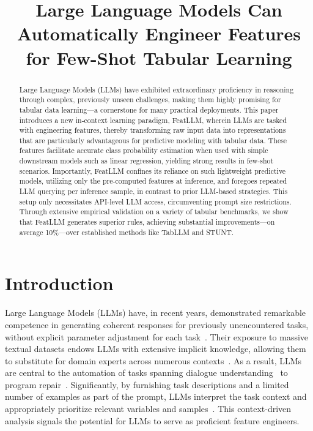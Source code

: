 \title{Large Language Models Can Automatically Engineer Features for Few-Shot Tabular Learning}

\begin{abstract}
Large Language Models (LLMs) have exhibited extraordinary proficiency in reasoning through complex, previously unseen challenges, making them highly promising for tabular data learning—a cornerstone for many practical deployments. This paper introduces a new in-context learning paradigm, \textsf{FeatLLM}, wherein LLMs are tasked with engineering features, thereby transforming raw input data into representations that are particularly advantageous for predictive modeling with tabular data. These features facilitate accurate class probability estimation when used with simple downstream models such as linear regression, yielding strong results in few-shot scenarios. Importantly, \textsf{FeatLLM} confines its reliance on such lightweight predictive models, utilizing only the pre-computed features at inference, and foregoes repeated LLM querying per inference sample, in contrast to prior LLM-based strategies. This setup only necessitates API-level LLM access, circumventing prompt size restrictions. Through extensive empirical validation on a variety of tabular benchmarks, we show that \textsf{FeatLLM} generates superior rules, achieving substantial improvements—on average 10\%—over established methods like TabLLM and STUNT.
\end{abstract}

\section{Introduction}
Large Language Models (LLMs) have, in recent years, demonstrated remarkable competence in generating coherent responses for previously unencountered tasks, without explicit parameter adjustment for each task~\cite{creswell2022selection,imani2023mathprompter,taylor2022galactica}. Their exposure to massive textual datasets endows LLMs with extensive implicit knowledge, allowing them to substitute for domain experts across numerous contexts~\cite{Genomes2021,singhal2023large,wilcox2003role}. As a result, LLMs are central to the automation of tasks spanning dialogue understanding~\cite{finch2023leveraging} to program repair~\cite{fan2023automated}. Significantly, by furnishing task descriptions and a limited number of examples as part of the prompt, LLMs interpret the task context and appropriately prioritize relevant variables and samples~\cite{brown2020language,zhao2023survey}. This context-driven analysis signals the potential for LLMs to serve as proficient feature engineers.

